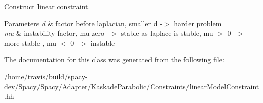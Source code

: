 Construct linear constraint. 


\begin{DoxyParams}{Parameters}
{\em d} & factor before laplacian, smaller d -\/$>$ harder problem \\
\hline
{\em mu} & instability factor, mu zero -\/$>$ stable as laplace is stable, mu $>$ 0 -\/$>$ more stable , mu $<$ 0 -\/$>$ instable \\
\hline
\end{DoxyParams}


The documentation for this class was generated from the following file\-:\begin{DoxyCompactItemize}
\item 
/home/travis/build/spacy-\/dev/\-Spacy/\-Spacy/\-Adapter/\-Kaskade\-Parabolic/\-Constraints/linear\-Model\-Constraint.\-hh\end{DoxyCompactItemize}
